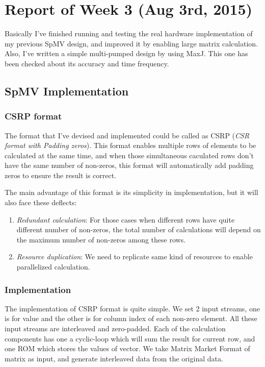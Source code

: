 \section{Report of Week 3 (Aug 3rd, 2015)}

Basically I've finished running and testing the real hardware implementation of my previous SpMV design, and improved it by enabling large matrix calculation. Also, I've written a simple multi-pumped design by using MaxJ. This one has been checked about its accuracy and time frequency. 

\subsection{SpMV Implementation}

\subsubsection{CSRP format} The format that I've devised and implemented could be called as CSRP (\textit{CSR format with Padding zeros}). This format enables multiple rows of elements to be calculated at the same time, and when those simultaneous caculated rows don't have the same number of non-zeros, this format will automatically add padding zeros to ensure the result is correct. 

The main advantage of this format is its simplicity in implementation, but it will also face these deflects:
\begin{enumerate}
\item \textit{Redundant calculation}: For those cases when different rows have quite different number of non-zeros, the total number of calculations will depend on the maximum number of non-zeros among these rows. 
\item \textit{Resource duplication}: We need to replicate same kind of resources to enable parallelized calculation. 
\end{enumerate}

\subsubsection{Implementation} The implementation of CSRP format is quite simple. We set 2 input streams, one is for value and the other is for column index of each non-zero element. All these input streams are interleaved and zero-padded. Each of the calculation components has one a cyclic-loop which will sum the result for current row, and one ROM which stores the values of vector. We take Matrix Market Format of matrix as input, and generate interleaved data from the original data. 

